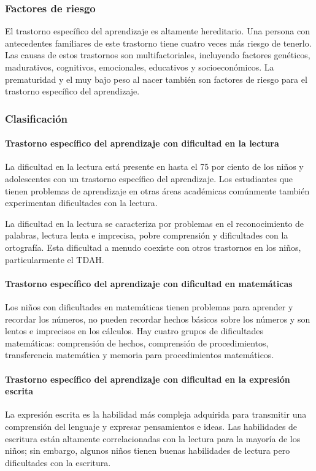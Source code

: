 \documentclass[11pt,letterpaper]{report}
\begin{document}
\subsubsection{Factores de riesgo}
El trastorno específico del aprendizaje es altamente hereditario. Una persona
con antecedentes familiares de este trastorno tiene cuatro veces más riesgo de
tenerlo. Las causas de estos trastornos son multifactoriales, incluyendo
factores genéticos, madurativos, cognitivos, emocionales, educativos y
socioeconómicos. La prematuridad y el muy bajo peso al nacer también son
factores de riesgo para el trastorno específico del aprendizaje.
\cite{Frierson2025, Boland2021-by}

\subsubsection{Clasificación}
\paragraph{Trastorno específico del aprendizaje con dificultad en la lectura}
La dificultad en la lectura está presente en hasta el 75 por ciento de los
niños y adolescentes con un trastorno específico del aprendizaje. Los
estudiantes que tienen problemas de aprendizaje en otras áreas académicas
comúnmente también experimentan dificultades con la lectura.
\cite{Boland2021-by}

La dificultad en la lectura se caracteriza por problemas en el reconocimiento
de palabras, lectura lenta e imprecisa, pobre comprensión y dificultades con
la ortografía. Esta dificultad a menudo coexiste con otros trastornos en los
niños, particularmente el TDAH. \cite{Boland2021-by}

\paragraph{Trastorno específico del aprendizaje con dificultad en matemáticas}
Los niños con dificultades en matemáticas tienen problemas para aprender y
recordar los números, no pueden recordar hechos básicos sobre los números y son
lentos e imprecisos en los cálculos. Hay cuatro grupos de dificultades
matemáticas: comprensión de hechos, comprensión de procedimientos,
transferencia matemática y memoria para procedimientos matemáticos.

\paragraph{Trastorno específico del aprendizaje con dificultad en la expresión escrita}
La expresión escrita es la habilidad más compleja adquirida para transmitir
una comprensión del lenguaje y expresar pensamientos e ideas. Las habilidades
de escritura están altamente correlacionadas con la lectura para la mayoría de
los niños; sin embargo, algunos niños tienen buenas habilidades de lectura
pero dificultades con la escritura.
\end{document}
